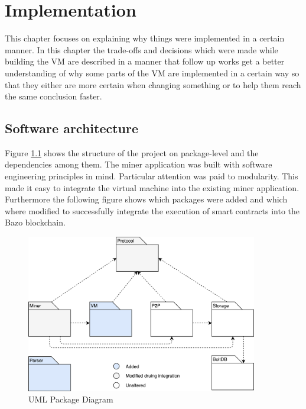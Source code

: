 \chapter{Implementation}
\thispagestyle{main} %
This chapter focuses on explaining why things were implemented in a certain manner. In this chapter the trade-offs and decisions which were made while building the VM are described in a manner that follow up works get a better understanding of why some parts of the VM are implemented in a certain way so that they either are more certain when changing something or to help them reach the same conclusion faster.

\section{Software architecture}
Figure \ref{package overview} shows the structure of the project on package-level and the dependencies among them. The miner application was built with software engineering principles in mind. Particular attention was paid to modularity. This made it easy to integrate the virtual machine into the existing miner application. Furthermore the following figure shows which packages were added and which where modified to successfully integrate the execution of smart contracts into the Bazo blockchain.
\begin{figure}[H]
	\begin{center}
	\includegraphics[width=0.9\textwidth]{./images/package-diagram}
	\caption{UML Package Diagram}
	\label{package overview}
	\end{center}
  \end{figure}
  

